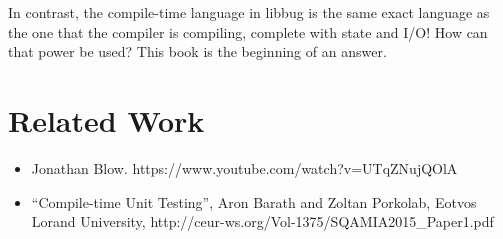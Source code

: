  In contrast, the compile-time
 language in libbug is the same exact language as the one that the compiler
 is compiling, complete with state and I/O!  How can that power be used?
 This book is the beginning of an answer.


\chapter{Related Work}
\begin{itemize}
        \item  Jonathan Blow. https://www.youtube.com/watch?v=UTqZNujQOlA
        \item  ``Compile-time Unit Testing'',
           Aron Barath and Zoltan Porkolab, Eotvos Lorand University, \newline
           http://ceur-ws.org/Vol-1375/SQAMIA2015\_Paper1.pdf
\end{itemize}

